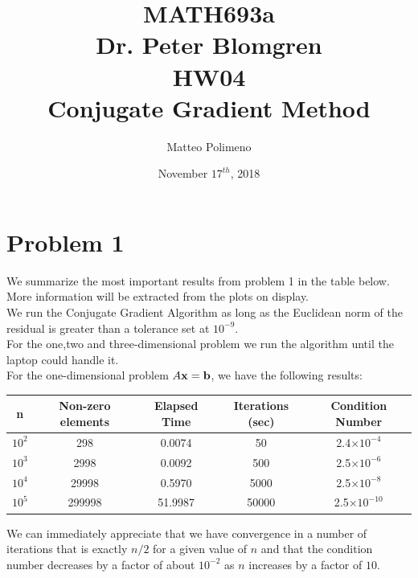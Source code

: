 \documentclass[a4paper,11pt]{article}
\author{Matteo Polimeno}
\date{November $17^{th}$, 2018}
\title{MATH693a\\
	Dr. Peter Blomgren\\
	HW04\\
	Conjugate Gradient Method}
\begin{document}
\maketitle
\section*{Problem 1}
We summarize the most important results from problem 1 in the table below. More information will be extracted from the plots on display.\\
We run the Conjugate Gradient Algorithm as long as the Euclidean norm of the residual is greater than a tolerance set at $10^{-9}$.\\
For the one,two and three-dimensional problem we run the algorithm until the laptop could handle it.\\
For the one-dimensional problem $A{\bf x} = {\bf b}$, we have the following results:
\begin{center}
	\begin{tabular}{||c | c | c | c | c|||} 
		\hline
		n & Non-zero elements & Elapsed Time & Iterations (sec) & Condition Number\\ [0.5ex] 
		\hline\hline
		$10^{2}$ & 298 & 0.0074 & 50 & 2.4$\times{10^{-4}}$\\ 
		\hline
		$10^{3}$ & 2998 & 0.0092 & 500 & 2.5$\times{10^{-6}}$\\
		\hline
		$10^{4}$ & 29998 & 0.5970 & 5000 & 2.5$\times{10^{-8}}$\\
		\hline
		$10^{5}$ & 299998 & 51.9987 & 50000 & 2.5$\times{10^{-10}}$\\
		\hline
	\end{tabular}
\end{center}

We can immediately appreciate that we have convergence in a number of iterations that is exactly $n/2$ for a given value of $n$ and that the condition number decreases by a factor of about $10^{-2}$ as $n$ increases by a factor of $10$.\\
\end{document}
